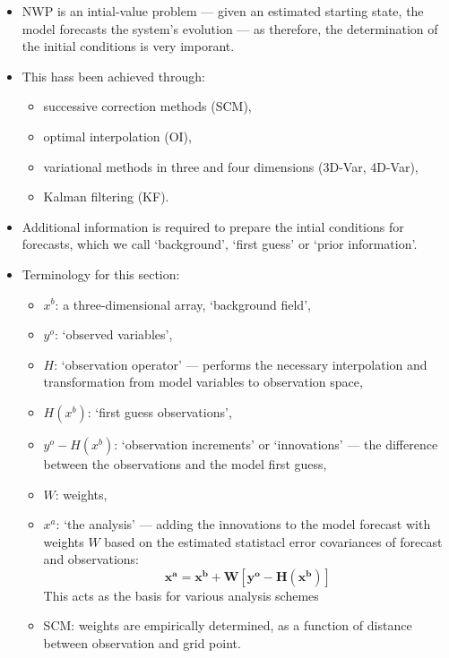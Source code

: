 \begin{itemize}
    \item NWP is an intial-value problem --- given an estimated starting state, the model forecasts the system's evolution --- as therefore, the determination of the initial conditions is very imporant.
    \item This hass been achieved through:
    \begin{itemize}
        \item successive correction methods (SCM),
        \item optimal interpolation (OI),
        \item variational methods in three and four dimensions (3D-Var, 4D-Var),
        \item Kalman filtering (KF).
    \end{itemize}
    \item Additional information is required to prepare the intial conditions for forecasts, which we call `background', `first guess' or `prior information'.
    \item Terminology for this section:
    \begin{itemize}
        \item $x^b$: a three-dimensional array, `background field',
        \item $y^o$: `observed variables',
        \item $H$: `observation operator' --- performs the necessary interpolation and transformation from model variables to observation space,
        \item $H \left( x^b \right)$: `first guess observations',
        \item $y^o - H \left( x^b \right)$: `observation increments' or `innovations' --- the difference between the observations and the model first guess,
        \item $W$: weights,
        \item $x^a$: `the analysis' --- adding the innovations to the model forecast with weights $W$ based on the estimated statistacl error covariances of forecast and observations:
        \begin{equation}
            \mathbf{x^a} = \mathbf{x^b} + \mathbf{W} 
            \left[ \mathbf{y^o} - \mathbf{H} \left( \mathbf{x^b} \right) \right]
        \end{equation}
        This acts as the basis for various analysis schemes
        \item SCM: weights are empirically determined, as a function of distance between observation and grid point.

\end{itemize}
\end{itemize}
